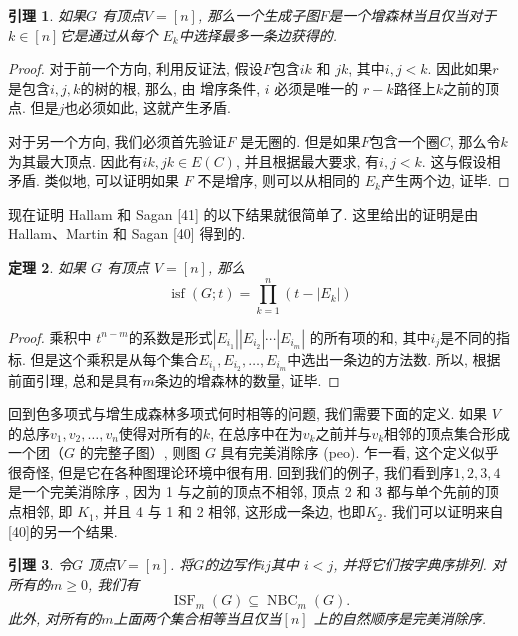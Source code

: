 \documentclass[a4paper,12pt]{ctexbook}
\newtheorem{lemma}{\hspace{2em}引理}[section]%
\newtheorem{theorem}[lemma]{\hspace{2em}定理}%
\begin{document}
\begin{lemma}
如果$G$ 有顶点$V=[n]$, 那么一个生成子图$F$是一个增森林当且仅当对于$k \in[n]$它是通过从每个 $E_{k}$中选择最多一条边获得的.
\end{lemma}
\begin{proof}
	对于前一个方向, 利用反证法, 假设$F$包含$i k$ 和 $j k$, 其中$i, j<k$. 因此如果$r$是包含$i, j, k$的树的根, 那么, 由
	增序条件, $i$ 必须是唯一的 $r-k$路径上$k$之前的顶点. 但是$j$也必须如此, 这就产生矛盾.

	对于另一个方向, 我们必须首先验证$F$ 是无圈的. 但是如果$F$包含一个圈$C$, 那么令$k$为其最大顶点. 因此有$i k, j k \in E(C)$, 并且根据最大要求, 有$i, j<k$. 这与假设相矛盾. 类似地, 可以证明如果 $F$ 不是增序, 则可以从相同的 $E_{k}$产生两个边, 证毕.
\end{proof}
 现在证明 Hallam 和 Sagan [41] 的以下结果就很简单了. 这里给出的证明是由 Hallam、Martin 和 Sagan [40] 得到的.
\begin{theorem}
	如果 $G$ 有顶点 $V=[n]$, 那么$$
	\operatorname{isf}(G ; t)=\prod_{k=1}^{n}\left(t-\left|E_{k}\right|\right)
	$$
\end{theorem}
\begin{proof}
	乘积中 $t^{n-m}$的系数是形式$\left|E_{i_{1}}\right|\left|E_{i_{2}}\right| \cdots\left|E_{i_{m}}\right|$ 的所有项的和, 其中$i_{j}$是不同的指标. 但是这个乘积是从每个集合$E_{i_{1}}, E_{i_{2}}, \ldots, E_{i_{m}}$中选出一条边的方法数. 所以, 根据前面引理, 总和是具有$m$条边的增森林的数量, 证毕.
\end{proof}
回到色多项式与增生成森林多项式何时相等的问题, 我们需要下面的定义. 如果 $V$ 的总序$v_{1}, v_{2}, \ldots, v_{n}$使得对所有的$k$, 在总序中在为$v_{k}$之前并与$v_{k}$相邻的顶点集合形成一个团（$G$ 的完整子图）,  则图 $G$ 具有完美消除序 (peo). 乍一看, 这个定义似乎很奇怪, 但是它在各种图理论环境中很有用. 回到我们的例子, 我们看到序$1,2,3,4$是一个完美消除序 , 因为 1 与之前的顶点不相邻, 顶点 2 和 3 都与单个先前的顶点相邻, 即 $K_{1}$, 并且 4 与 1 和 2 相邻, 这形成一条边, 也即$K_{2}$. 我们可以证明来自 [40]的另一个结果.
 \begin{lemma}
 	令$G$ 顶点$V=[n]$. 将$G$的边写作$i j$其中 $i<j$, 并将它们按字典序排列. 对所有的$m \geq 0$, 我们有$$
 	\operatorname{ISF}_{m}(G) \subseteq \operatorname{NBC}_{m}(G) .
 	$$此外, 对所有的$m$上面两个集合相等当且仅当$[n]$ 上的自然顺序是完美消除序.
 \end{lemma}
\end{document}

